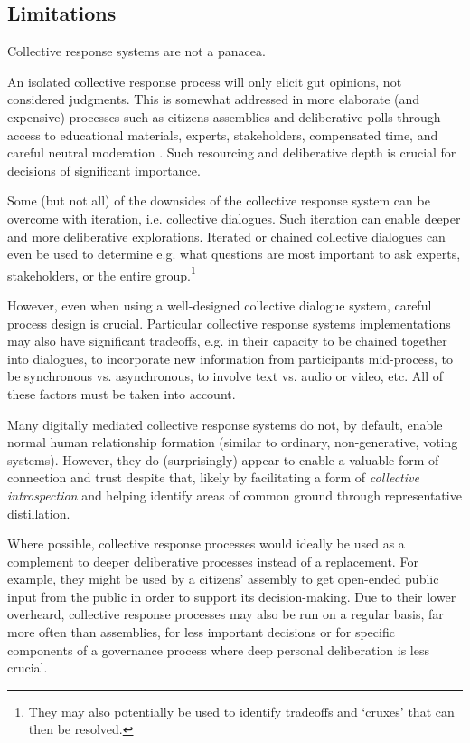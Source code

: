 \documentclass[sigconf,authorversion,nonacm,linkcolor=blue,colorlinks]{acmart}
\begin{document}
\subsection{Limitations}
Collective response systems are not a panacea. 

An isolated collective response process will only elicit gut opinions, not considered judgments. This is somewhat addressed in more elaborate (and expensive) processes such as citizens assemblies and deliberative polls through access to educational materials, experts, stakeholders, compensated time, and careful neutral moderation \cite{fishkin2019DemocracyWhenPeople, kimbrawhite2022FacilitatingDeliberationPractical, oecdInnovativeCitizenParticipation2020a}. Such resourcing and deliberative depth is crucial for decisions of significant importance. 

Some (but not all) of the downsides of the collective response system can be overcome with iteration, i.e. collective dialogues. Such iteration can enable deeper and more deliberative explorations. Iterated or chained collective dialogues can even be used to determine e.g. what questions are most important to ask experts, stakeholders, or the entire group.\footnote{They may also potentially be used to identify tradeoffs and `cruxes' that can then be resolved.}

However, even when using a well-designed collective dialogue system, careful process design is crucial. Particular collective response systems implementations may also have significant tradeoffs, e.g. in their capacity to be chained together into dialogues, to incorporate new information from participants mid-process, to be synchronous vs. asynchronous, to involve text vs. audio or video, etc. All of these factors must be taken into account.

Many digitally mediated collective response systems do not, by default, enable normal human relationship formation (similar to ordinary, non-generative, voting systems). However, they do (surprisingly) appear to enable a valuable form of connection and trust despite that, likely by facilitating a form of \emph{collective introspection} and helping identify areas of common ground through representative distillation. %

Where possible, collective response processes would ideally be used as a complement to deeper deliberative processes instead of a replacement. For example, they might be used by a citizens' assembly to get open-ended public input from the public in order to support its decision-making. Due to their lower overheard, collective response processes may also be run on a regular basis, far more often than assemblies, for less important decisions or for specific components of a governance process where deep personal deliberation is less crucial.
\end{document}
